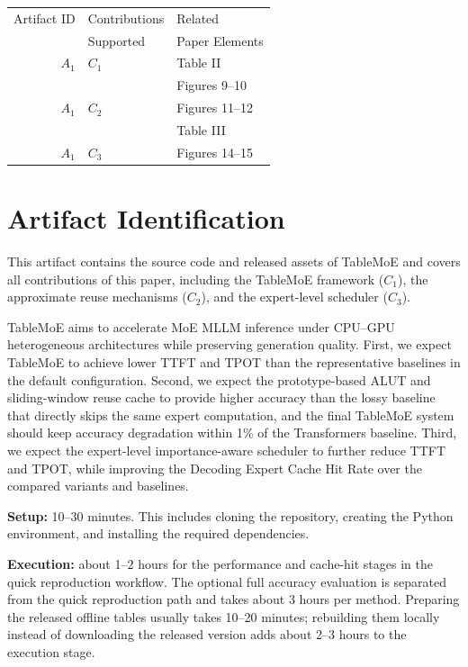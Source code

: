 \documentclass[conference]{IEEEtran}
\begin{document}
\begin{center}
\begin{tabular}{rll}
\toprule
Artifact ID  &  Contributions &  Related \\
             &  Supported     &  Paper Elements \\
\midrule
$A_1$   &  $C_1$ & Table II \\
        &        & Figures 9--10 \\
\midrule
$A_1$   &  $C_2$ & Figures 11--12 \\
        &        & Table III \\
\midrule
$A_1$   &  $C_3$ & Figures 14--15 \\
\bottomrule
\end{tabular}
\end{center}

\section{Artifact Identification}

\newartifact

\artrel

This artifact contains the source code and released assets of TableMoE and
covers all contributions of this paper, including the TableMoE framework
($C_1$), the approximate reuse mechanisms ($C_2$), and the expert-level
scheduler ($C_3$).

\artexp

TableMoE aims to accelerate MoE MLLM inference under CPU--GPU heterogeneous
architectures while preserving generation quality. First, we expect TableMoE
to achieve lower TTFT and TPOT than the representative baselines in the default
configuration. Second, we expect the prototype-based ALUT and sliding-window
reuse cache to provide higher accuracy than the lossy baseline that directly
skips the same expert computation, and the final TableMoE system should keep
accuracy degradation within 1\% of the Transformers baseline. Third, we expect
the expert-level importance-aware scheduler to further reduce TTFT and TPOT,
while improving the Decoding Expert Cache Hit Rate over the compared variants
and baselines.

\arttime

\noindent\textbf{Setup:} 10--30 minutes. This includes cloning the repository,
creating the Python environment, and installing the required dependencies.

\noindent\textbf{Execution:} about 1--2 hours for the performance and
cache-hit stages in the quick reproduction workflow. The optional full
accuracy evaluation is separated from the quick reproduction path and takes
about 3 hours per method. Preparing the released offline tables usually takes
10--20 minutes; rebuilding them locally instead of downloading the released
version adds about 2--3 hours to the execution stage.
\end{document}
